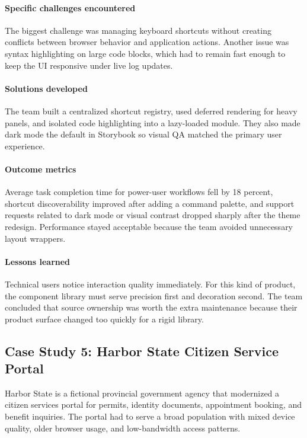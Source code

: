 \paragraph{Specific challenges encountered}
The biggest challenge was managing keyboard shortcuts without creating conflicts between browser behavior and application actions. Another issue was syntax highlighting on large code blocks, which had to remain fast enough to keep the UI responsive under live log updates.

\paragraph{Solutions developed}
The team built a centralized shortcut registry, used deferred rendering for heavy panels, and isolated code highlighting into a lazy-loaded module. They also made dark mode the default in Storybook so visual QA matched the primary user experience.

\paragraph{Outcome metrics}
Average task completion time for power-user workflows fell by 18 percent, shortcut discoverability improved after adding a command palette, and support requests related to dark mode or visual contrast dropped sharply after the theme redesign. Performance stayed acceptable because the team avoided unnecessary layout wrappers.

\paragraph{Lessons learned}
Technical users notice interaction quality immediately. For this kind of product, the component library must serve precision first and decoration second. The team concluded that source ownership was worth the extra maintenance because their product surface changed too quickly for a rigid library.

\subsection{Case Study 5: Harbor State Citizen Service Portal}
Harbor State is a fictional provincial government agency that modernized a citizen services portal for permits, identity documents, appointment booking, and benefit inquiries. The portal had to serve a broad population with mixed device quality, older browser usage, and low-bandwidth access patterns.

